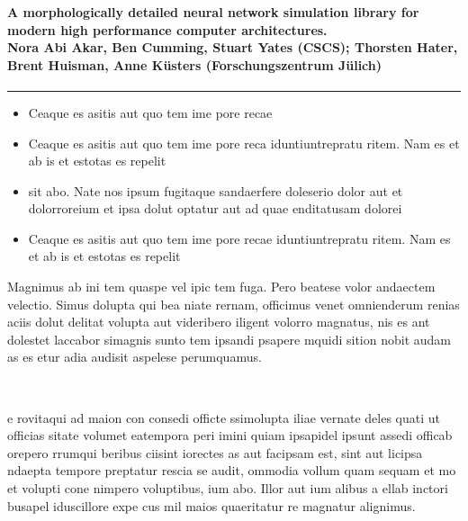 \documentclass{beamer}
\begin{document}
\begin{frame}[t]
  \frametitle{ }
  \framesubtitle{A morphologically detailed neural network simulation library for modern high performance computer architectures.\\
  \tiny{Nora Abi Akar, Ben Cumming, Stuart Yates (CSCS); Thorsten Hater, Brent Huisman, Anne Küsters (Forschungszentrum Jülich)}}

  \begin{appendixblock}
    \begin{minipage}[c]{.48\linewidth}
      \centering
      \color{fzjblue}\rule{0.9\linewidth}{0.2\paperheight}
    \end{minipage}
    \hfill
    \begin{minipage}[c]{.48\linewidth}
      \begin{itemize}
      \item Ceaque es asitis aut quo tem ime pore recae
      \item Ceaque es asitis aut quo tem ime pore reca
        iduntiuntrepratu ritem. Nam es et ab is et estotas es repelit
      \item sit abo. Nate nos ipsum fugitaque sandaerfere doleserio
        dolor aut et dolorroreium et ipsa dolut optatur aut ad quae
        enditatusam dolorei
      \item Ceaque es asitis aut quo tem ime pore recae
        iduntiuntrepratu ritem. Nam es et ab is et estotas es repelit
      \end{itemize}
    \end{minipage}
  \end{appendixblock}

  Magnimus ab ini tem quaspe vel ipic tem fuga. Pero beatese volor
  andaectem velectio. Simus dolupta qui bea niate rernam, officimus
  venet omnienderum renias aciis dolut delitat volupta aut videribero
  iligent volorro magnatus, nis es ant dolestet laccabor simagnis
  sunto tem ipsandi psapere mquidi sition nobit audam as es etur adia
  audisit aspelese perumquamus.\\[1.5ex]

  \begin{columns}[onlytextwidth]
    \begin{column}{.49\linewidth}
      \textbf{}\\
      e rovitaqui ad maion con consedi officte ssimolupta iliae
      vernate deles quati ut officias sitate volumet eatempora peri
      imini quiam ipsapidel ipsunt assedi officab orepero rrumqui
      beribus ciisint iorectes as aut facipsam est, sint aut licipsa
      ndaepta tempore preptatur rescia se audit, ommodia vollum quam
      sequam et mo et volupti cone nimpero voluptibus, ium abo. Illor
      aut ium alibus a ellab inctori busapel iduscillore expe cus mil
      maios quaeritatur re magnatur alignimus.\\[1ex]


\end{column}
\end{columns}
\end{frame}
\end{document}
